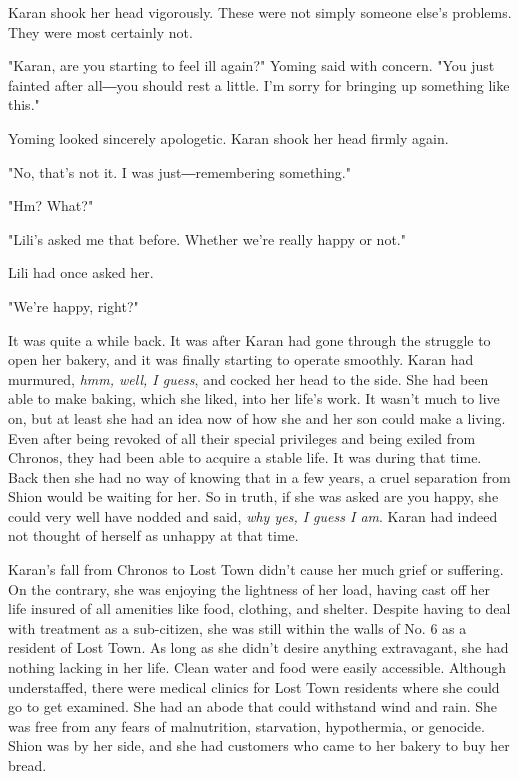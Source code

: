 Karan shook her head vigorously. These were not simply someone else's
problems. They were most certainly not.

"Karan, are you starting to feel ill again?" Yoming said with concern.
"You just fainted after all―you should rest a little. I'm sorry for
bringing up something like this."

Yoming looked sincerely apologetic. Karan shook her head firmly again.

"No, that's not it. I was just―remembering something."

"Hm? What?"

"Lili's asked me that before. Whether we're really happy or not."

Lili had once asked her.

"We're happy, right?"

It was quite a while back. It was after Karan had gone through the
struggle to open her bakery, and it was finally starting to operate
smoothly. Karan had murmured, \emph{hmm, well, I guess}, and cocked her head to
the side. She had been able to make baking, which she liked, into her
life's work. It wasn't much to live on, but at least she had an idea now
of how she and her son could make a living. Even after being revoked of
all their special privileges and being exiled from Chronos, they had
been able to acquire a stable life. It was during that time. Back then
she had no way of knowing that in a few years, a cruel separation from
Shion would be waiting for her. So in truth, if she was asked are you
happy, she could very well have nodded and said, \emph{why yes, I guess I am}.
Karan had indeed not thought of herself as unhappy at that time.

Karan's fall from Chronos to Lost Town didn't cause her much grief or
suffering. On the contrary, she was enjoying the lightness of her load,
having cast off her life insured of all amenities like food, clothing,
and shelter. Despite having to deal with treatment as a sub-citizen, she
was still within the walls of No. 6 as a resident of Lost Town. As long
as she didn't desire anything extravagant, she had nothing lacking in
her life. Clean water and food were easily accessible. Although
understaffed, there were medical clinics for Lost Town residents where
she could go to get examined. She had an abode that could withstand wind
and rain. She was free from any fears of malnutrition, starvation,
hypothermia, or genocide. Shion was by her side, and she had customers
who came to her bakery to buy her bread.


